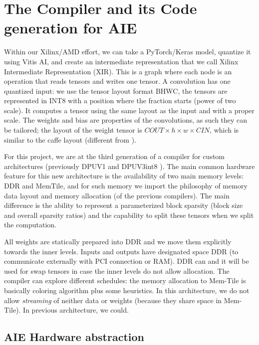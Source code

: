 \documentclass[conference]{IEEEtran}
\begin{document}
\section{The Compiler and its Code generation for AIE}
\label{sec:compiler}
Within our Xilinx/AMD effort, we can take a PyTorch/Keras model,
quantize it using Vitis AI, and create an intermediate representation
that we call Xilinx Intermediate Representation (XIR). This is a graph
where each node is an operation that reads tensors and writes one tensor. A
convolution has one quantized input: we use the tensor layout format
BHWC, the tensors are represented in INT8 with a position where the
fraction starts (power of two scale). It computes a tensor using the
same layout as the input and with a proper scale. The weights and bias
are properties of the convolutions, as such they can be tailored; the
layout of the weight tensor is $COUT\times h \times w \times CIN$,
which is similar to the caffe layout \cite{Caffe} (different from
\cite{tensorflow}).

For this project, we are at the third generation of a compiler for
custom architectures (previously DPUV1 and DPUV3int8
\cite{10.1145/3473334,abs-2110-04327}). The main common hardware
feature for this new architecture is the availability of two main
memory levels: DDR and MemTile, and for such memory we import the
philosophy of memory data layout and memory allocation (of the
previous compilers). The main difference is the ability to represent a
parameterized block sparsity (block size and overall sparsity ratios)
and the capability to split these tensors when we split the computation.

All weights are statically prepared into DDR and we move them
explicitly towards the inner levels. Inputs and outputs have
designated space DDR (to communicate externally with PCI connection or
RAM). DDR can and it will be used for swap tensors in case the inner
levels do not allow allocation.  The compiler can explore different
schedules: the memory allocation to Mem-Tile is basically coloring
algorithm plus some heuristics. In this architecture, we do not allow
{\em streaming} of neither data or weights (because they share space
in Mem-Tile). In previous architecture, we could.

\subsection{AIE Hardware abstraction}

\end{document}
